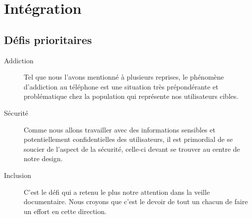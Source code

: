 \section{Intégration}

\subsection{Défis prioritaires}
\begin{description}
	\item[Addiction] Tel que nous l'avons mentionné à plusieurs reprises, le phénomène d'addiction au téléphone est une situation très prépondérante et problématique chez la population qui représente nos utilisateurs cibles.
	\item[Sécurité] Comme nous allons travailler avec des informations sensibles et potentiellement confidentielles des utilisateurs, il est primordial de se soucier de l'aspect de la sécurité, celle-ci devant se trouver au centre de notre design.
	\item[Inclusion] C'est le défi qui a retenu le plus notre attention dans la veille documentaire. Nous croyons que c'est le devoir de tout un chacun de faire un effort en cette direction. 
\end{description}

